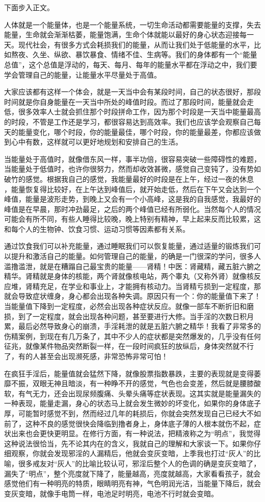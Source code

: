 下面步入正文。

人体就是一个能量体，也是一个能量系统，一切生命活动都需要能量的支撑，失去能量，生命就会渐渐枯萎，能量饱满，生命个体就能以最好的身心状态迎接每一天。现代社会，有很多方式会耗损我们的能量，从而让我们处于低能量的水平，比如熬夜、久坐、纵欲、暴饮暴食、情绪不佳、生病等。我们的身体都有一个“能量总值”，这个总值是浮动的，每天、每月、每年的能量水平都在浮动之中，我们要学会管理自己的能量，让能量水平尽量处于高值。

大家应该都有这样一个体会，就是一天当中会有某段时间，自己的状态很好，那段时间就是你自身能量在一天当中所处的峰值时段。而过了那段时间，能量就会走低，很多效率人士就会抓住那个时段拼命工作，因为那个时段是一天当中能量最高的时段，不管是工作还是学习，都很容易达到高效率。我们也应该学会观察自己每天的能量变化，哪个时段，你的能量最佳，哪个时段，你的能量最差，你都应该做到心中有数，这样就可以更好地规划和安排自己的生活。

当能量处于高值时，就像借东风一样，事半功倍，很容易突破一些障碍性的难题，当能量处于低值时，也许你很努力，然而却收效甚微，感觉自己变钝了，没有势如破竹的感觉。根据我自己的感觉，我能量最好的时段是在上午，经过一夜的休息 ，能量恢复得比较好，在上午达到峰值后，就开始走低，然后在下午又会达到一个峰值，能量是波形走势，到晚上又会有一个小高峰，这是我的自我感觉，我最好的峰值是在早晨，那时冲劲最足，之后的两个峰值已经有所弱化。当然每个人的情况可能会有所不同，有些人睡得比较晚，晚上特别有精神，早上起来反而比较累，这和每个人的生物钟、饮食习惯、运动习惯等因素都有关系。

通过饮食我们可以补充能量，通过睡眠我们可以恢复能量，通过适量的锻炼我们可以提升和激活自己的能量。如何管理自己的能量，的确是一门很深的学问，很多人滥撸滥泄，就是在糟蹋自己最宝贵的能量——肾精！中医：肾藏精，藏五脏六腑之精华。肾精就是身体的核能，两个肾就像核电站，两个睾丸（又称外肾）就像核反应堆，肾精充足，在学业和事业上，才能拥有核动力。当肾精亏损到一定程度，那就会导致症状缠身，身心都会出现各种失调。原因只有一个：你的能量值下来了！当能量值下降到一定程度，必然会出现各种症状反应。就像一部车不断折旧和磨损，到了一定程度，就会出现各种问题，甚至要进行大修。当手淫的次数日积月累，最后必然导致身心的崩溃，手淫耗泄的就是五脏六腑之精华！我看了非常多的伤精案例，到现在有几万条了，其中不少人的症状都是突然爆发的，几乎没有任何征兆，就像某件物品突然断裂一样，在一段时间疯狂的放纵后，身体突然就不行了，有的人甚至会出现濒死感，非常恐怖非常可怕！

在疯狂手淫后，能量值就会猛然下降，就像股票指数暴跌，主要的表现就是变得萎靡不振，双眼无神且暗淡，有一种睁不开的感觉，气色也会变差，然后就是腰膝酸软，有气无力，还会出现尿频腹痛、头晕头痛等症状表现。这其实就是能量漏失的一种表现，能量走漏，身心的状态马上就会发生微妙的坏变化，如果你的身体底子厚，可能暂时感觉不到，然而经过几年的耗损后，你就会突然发现自己已经大不如前了，这种不良的感觉很快会降临到撸者身上，身体底子薄的人根本就伤不起，症状出来也会更快更明显。在修行方面，有一种说法，把精液称之为“明点”，我觉得这种说法很恰当，先不论其内在的含义，我就自己的理解和大家谈一下。如果你仔细观察，你就会发现邪淫的人漏精后，他就会变灰变暗，上季我也打过“灰人”的比喻，很多戒友对“灰人”的比喻比较认可，邪淫后整个人的色调的确是变灰变暗了，漏失了“明点”，整个亮度就下降了，能量越高，亮度就越高，大家看看孩子，就会感觉他们有一种明亮的特质，眼睛明亮有神，气色明润光洁，当能量下降后，就会变灰变暗，就像手电筒一样，电池足时明亮，电池不行时就会变暗。

